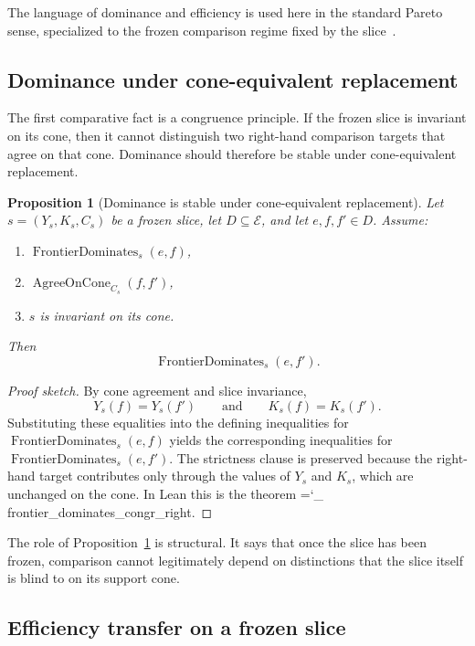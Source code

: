 \documentclass[11pt]{article}
\newtheorem{proposition}{Proposition}
\newcommand{\lid}[1]{{\small\ttfamily\hyphenchar\font=`\_ #1}}
\begin{document}
The language of dominance and efficiency is used here in the standard Pareto sense, specialized to the frozen comparison regime fixed by the slice~\cite{MasColellWhinstonGreen1995}.

\subsection*{Dominance under cone-equivalent replacement}

The first comparative fact is a congruence principle. If the frozen slice is invariant on its cone, then it cannot distinguish two right-hand comparison targets that agree on that cone. Dominance should therefore be stable under cone-equivalent replacement.

\begin{proposition}[Dominance is stable under cone-equivalent replacement]\label{prop:dominance-congruence}
Let \(s=(Y_s,K_s,C_s)\) be a frozen slice, let \(D\subseteq \mathcal{E}\), and let \(e,f,f'\in D\). Assume:
\begin{enumerate}
\item \(\operatorname{FrontierDominates}_s(e,f)\),
\item \(\operatorname{AgreeOnCone}_{C_s}(f,f')\),
\item \(s\) is invariant on its cone.
\end{enumerate}
Then
\[
\operatorname{FrontierDominates}_s(e,f').
\]
\end{proposition}

\begin{proof}[Proof sketch]
By cone agreement and slice invariance,
\[
Y_s(f)=Y_s(f')\qquad\text{and}\qquad K_s(f)=K_s(f').
\]
Substituting these equalities into the defining inequalities for \(\operatorname{FrontierDominates}_s(e,f)\) yields the corresponding inequalities for \(\operatorname{FrontierDominates}_s(e,f')\). The strictness clause is preserved because the right-hand target contributes only through the values of \(Y_s\) and \(K_s\), which are unchanged on the cone. In Lean this is the theorem \lid{frontier\_dominates\_congr\_right}.
\end{proof}

The role of Proposition~\ref{prop:dominance-congruence} is structural. It says that once the slice has been frozen, comparison cannot legitimately depend on distinctions that the slice itself is blind to on its support cone.

\subsection*{Efficiency transfer on a frozen slice}
\end{document}
